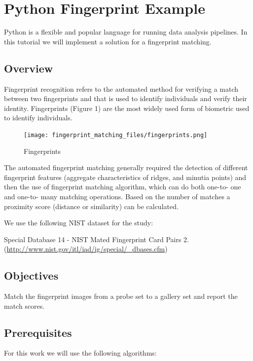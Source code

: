 \chapter{Python Fingerprint Example}\label{python-fingerprint-example}

Python is a flexible and popular language for running data analysis
pipelines. In this tutorial we will implement a solution for a
fingerprint matching.

\section{Overview}\label{overview}

Fingerprint recognition refers to the automated method for verifying a
match between two fingerprints and that is used to identify individuals
and verify their identity. Fingerprints (Figure 1) are the most widely
used form of biometric used to identify individuals.

\begin{figure}
\centering
\texttt{[image: fingerprint\_matching\_files/fingerprints.png]}
\caption{Fingerprints}
\end{figure}

The automated fingerprint matching generally required the detection of
different fingerprint features (aggregate characteristics of ridges, and
minutia points) and then the use of fingerprint matching algorithm,
which can do both one-to- one and one-to- many matching operations.
Based on the number of matches a proximity score (distance or
similarity) can be calculated.

We use the following NIST dataset for the study:

Special Database 14 - NIST Mated Fingerprint Card Pairs 2.
(\url{http://www.nist.gov/itl/iad/ig/special/_dbases.cfm})


\section{Objectives}\label{objectives}

Match the fingerprint images from a probe set to a gallery set and
report the match scores.

\section{Prerequisites}\label{prerequisites}

For this work we will use the following algorithms:

